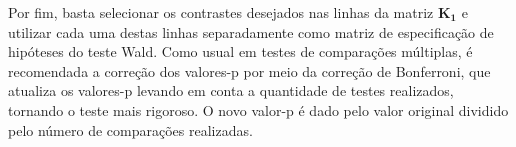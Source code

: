 Por fim, basta selecionar os contrastes desejados nas linhas da matriz $\boldsymbol{K_1}$ e utilizar cada uma destas linhas separadamente como matriz de especificação de hipóteses do teste Wald. Como usual em testes de comparações múltiplas, é recomendada a correção dos valores-p por meio da correção de Bonferroni, que atualiza os valores-p levando em conta a quantidade de testes realizados, tornando o teste mais rigoroso. O novo valor-p é dado pelo valor original dividido pelo número de comparações realizadas.



